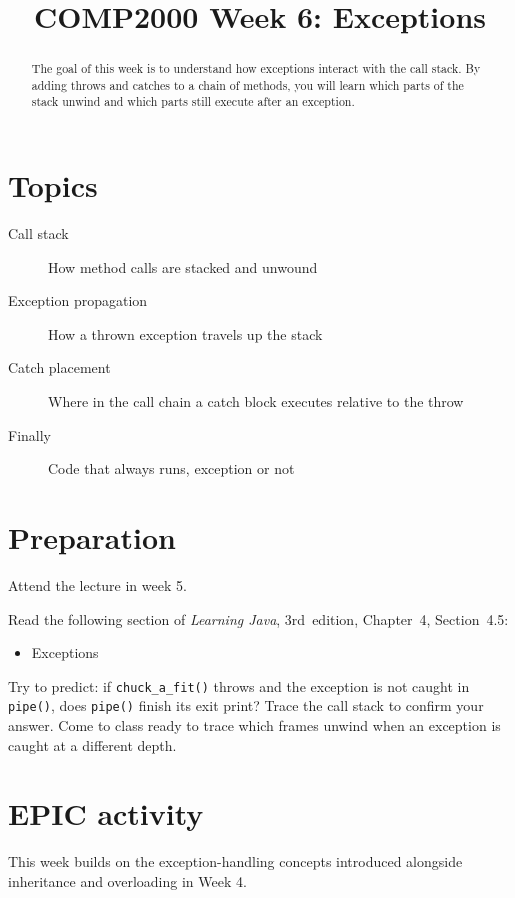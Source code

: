 \documentclass[twoside=false,DIV=14]{scrartcl}
\title{\color{redish} \vspace{-1em}COMP2000 Week 6: Exceptions}
\begin{document}
{\color{blackish}\maketitle}\vspace{-7em}

\begin{abstract}
The goal of this week is to understand how exceptions interact with the call stack.  By adding throws and catches to a chain of methods, you will learn which parts of the stack unwind and which parts still execute after an exception.
\end{abstract}

\section*{Topics}
\begin{description}
\item[Call stack] How method calls are stacked and unwound
\item[Exception propagation] How a thrown exception travels up the stack
\item[Catch placement] Where in the call chain a catch block executes relative to the throw
\item[Finally] Code that always runs, exception or not
\end{description}

\section*{Preparation}
Attend the lecture in week 5.

Read the following section of \textit{Learning Java}, 3rd~edition, Chapter~4,
Section~4.5:
\begin{itemize}
    \item Exceptions
\end{itemize}

Try to predict: if \texttt{chuck\_a\_fit()} throws and the exception is not caught in \texttt{pipe()}, does \texttt{pipe()} finish its exit print?  Trace the call stack to confirm your answer.
Come to class ready to trace which frames unwind when an exception is caught at a different depth.


\section*{EPIC activity}

\begin{note}
This week builds on the exception-handling concepts introduced alongside inheritance and overloading in Week 4.
\end{note}
\end{document}
